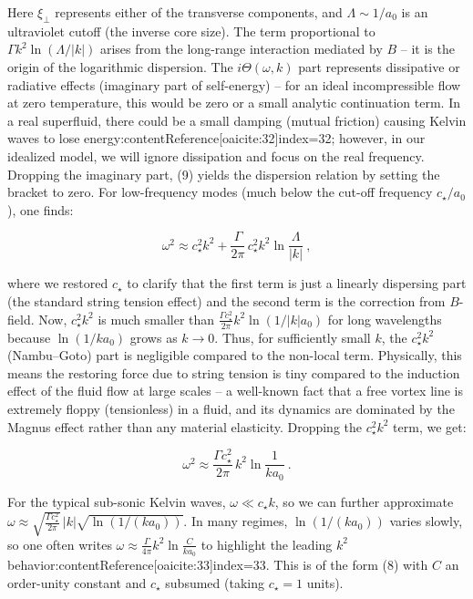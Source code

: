 \documentclass[12pt]{article}
\begin{document}
Here $\xi_\perp$ represents either of the transverse components, and $\Lambda\sim 1/a_0$ is an ultraviolet cutoff (the inverse core size). The term proportional to $\Gamma k^2 \ln(\Lambda/|k|)$ arises from the long-range interaction mediated by $B$ – it is the origin of the logarithmic dispersion. The $i\Theta(\omega,k)$ part represents dissipative or radiative effects (imaginary part of self-energy) – for an ideal incompressible flow at zero temperature, this would be zero or a small analytic continuation term. In a real superfluid, there could be a small damping (mutual friction) causing Kelvin waves to lose energy:contentReference[oaicite:32]{index=32}; however, in our idealized model, we will ignore dissipation and focus on the real frequency. Dropping the imaginary part, (9) yields the dispersion relation by setting the bracket to zero. For low-frequency modes (much below the cut-off frequency $c_\star/a_0$), one finds:

\[ \omega^2 \approx c_\star^2 k^2 + \frac{\Gamma}{2\pi}\, c_\star^2 k^2 \ln\frac{\Lambda}{|k|}~, \tag{10}\]

where we restored $c_\star$ to clarify that the first term is just a linearly dispersing part (the standard string tension effect) and the second term is the correction from $B$-field. Now, $c_\star^2 k^2$ is much smaller than $\frac{\Gamma c_\star^2}{2\pi} k^2 \ln(1/|k|a_0)$ for long wavelengths because $\ln(1/ka_0)$ grows as $k\to 0$. Thus, for sufficiently small $k$, the $c_\star^2 k^2$ (Nambu–Goto) part is negligible compared to the non-local term. Physically, this means the restoring force due to string tension is tiny compared to the induction effect of the fluid flow at large scales – a well-known fact that a free vortex line is extremely floppy (tensionless) in a fluid, and its dynamics are dominated by the Magnus effect rather than any material elasticity. Dropping the $c_\star^2 k^2$ term, we get:

\[ \omega^2 \approx \frac{\Gamma c_\star^2}{2\pi}\, k^2 \ln\frac{1}{k a_0}~. \tag{11} \]

For the typical sub-sonic Kelvin waves, $\omega \ll c_\star k$, so we can further approximate $\omega \approx \sqrt{\frac{\Gamma c_\star^2}{2\pi}}\, |k| \sqrt{\ln(1/(k a_0))}$. In many regimes, $\ln(1/(k a_0))$ varies slowly, so one often writes $\omega \approx \frac{\Gamma}{4\pi} k^2 \ln\frac{C}{k a_0}$ to highlight the leading $k^2$ behavior:contentReference[oaicite:33]{index=33}. This is of the form (8) with $C$ an order-unity constant and $c_\star$ subsumed (taking $c_\star=1$ units). 
\end{document}
